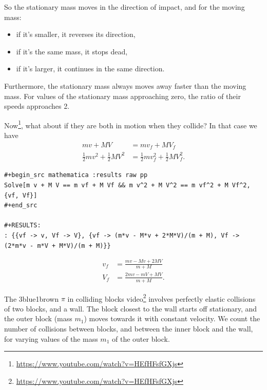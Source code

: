 So the stationary mass moves in the direction of impact, and for the moving mass:
\begin{itemize}
\item if it's smaller, it reverses its direction,
\item if it's the same mass, it stops dead,
\item if it's larger, it continues in the same direction.
\end{itemize}
Furthermore, the stationary mass always moves away faster than the moving mass. For values of the
stationary mass approaching zero, the ratio of their speeds approaches 2.


Now\footnote{\url{https://www.youtube.com/watch?v=HEfHFsfGXjs}}, what about if they are both in
motion when they collide? In that case we have
\begin{align}
  mv + MV                           &= mv_f + MV_f \\
  \frac{1}{2}mv^2 + \frac{1}{2}MV^2 &= \frac{1}{2}mv_f^2 + \frac{1}{2}MV_f^2.
\end{align}
\begin{verbatim}
#+begin_src mathematica :results raw pp
Solve[m v + M V == m vf + M Vf && m v^2 + M V^2 == m vf^2 + M Vf^2, {vf, Vf}]
#+end_src

#+RESULTS:
: {{vf -> v, Vf -> V}, {vf -> (m*v - M*v + 2*M*V)/(m + M), Vf -> (2*m*v - m*V + M*V)/(m + M)}}
\end{verbatim}
\begin{align*}
  v_f &= \frac{mv - Mv + 2MV}{m + M} \\
  V_f &= \frac{2mv - mV + MV}{m + M}.
\end{align*}

\newpage
The 3blue1brown $\pi$ in colliding blocks
video\footnote{\url{https://www.youtube.com/watch?v=HEfHFsfGXjs}} involves perfectly elastic
collisions of two blocks, and a wall. The block closest to the wall starts off stationary, and the
outer block (mass $m_1$) moves towards it with constant velocity. We count the number of collisions
between blocks, and between the inner block and the wall, for varying values of the mass $m_1$ of
the outer block.

